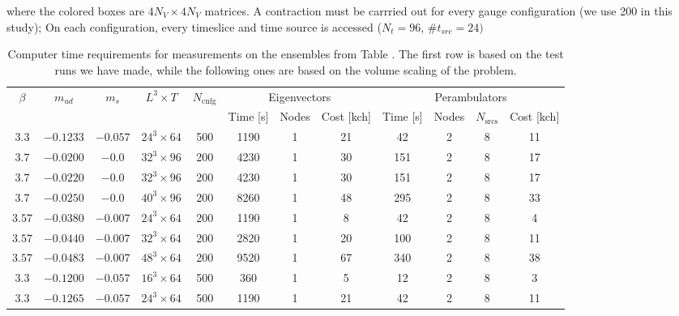 where the colored boxes are $4N_V \times 4N_V$ matrices. A contraction must be carrried out for every gauge configuration (we use 200 in this study); On each configuration, every timeslice and time source is accessed ($N_t = 96$,  $\#t_{src} = 24)$ 

\begin{table}[!h]
  \centering \footnotesize
  \hspace*{-0.6cm}
  \begin{tabular}{|c|c|c|c|c|c|c|c|c|c|c|c|}
  \hline
  \multirow{2}{*}{$\beta$}  & \multirow{2}{*}{$m_{ud}$}   & \multirow{2}{*}{$m_{s}$}   & \multirow{2}{*}{$L^3 \times T$}  & \multirow{2}{*}{$N_\mathrm{cnfg}$} & \multicolumn{3}{c|}{Eigenvectors} & \multicolumn{4}{c|}{Perambulators} \\
  & & & & & Time [s] & Nodes & Cost [kch] & Time [s] & Nodes & $N_\mathrm{srcs}$ & Cost [kch] \\
  \hline \hline
  $3.3$    & $-0.1233$  & $-0.057$  & $24^3\times64$  & 500  & 1190 & 1 & 21  & 42  & 2 & 8 & 11  \\ \hline
  $3.7$    & $-0.0200$  & $-0.0$    & $32^3\times96$  & 200  & 4230 & 1 & 30  & 151 & 2 & 8 & 17  \\ 
  $3.7$    & $-0.0220$  & $-0.0$    & $32^3\times96$  & 200  & 4230 & 1 & 30  & 151 & 2 & 8 & 17  \\ 
  $3.7$    & $-0.0250$  & $-0.0$    & $40^3\times96$  & 200  & 8260 & 1 & 48  & 295 & 2 & 8 & 33  \\ \hline
  $3.57$   & $-0.0380$  & $-0.007$  & $24^3\times64$  & 200  & 1190 & 1 & 8   & 42  & 2 & 8 & 4   \\ 
  $3.57$   & $-0.0440$  & $-0.007$  & $32^3\times64$  & 200  & 2820 & 1 & 20  & 100 & 2 & 8 & 11  \\ 
  $3.57$   & $-0.0483$  & $-0.007$  & $48^3\times64$  & 200  & 9520 & 1 & 67  & 340 & 2 & 8 & 38  \\ \hline
  $3.3$    & $-0.1200$  & $-0.057$  & $16^3\times64$  & 500  & 360  & 1 & 5   & 12  & 2 & 8 & 3   \\ 
  $3.3$    & $-0.1265$  & $-0.057$  & $24^3\times64$  & 500  & 1190 & 1 & 21  & 42  & 2 & 8 & 11  \\ \hline
  \end{tabular}
  \caption{Computer time requirements for measurements on the ensembles from Table . The first row is based on the test runs we have made, while the following ones are based on the volume scaling of the problem.}
  \label{tab:ensembles}
  \end{table}



